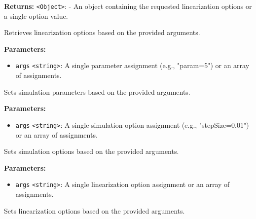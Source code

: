 \documentclass[12pt,a4paper]{article}
\begin{document}
\noindent \textbf{Returns:} \texttt{<Object>}: - An object containing the requested linearization options or a single option value.

\noindent Retrieves linearization options based on the provided arguments.

\vspace{5mm}
\noindent {}


\noindent \textbf{Parameters:}
\begin{itemize}
  \item \texttt{args} \texttt{<string>}: A single parameter assignment (e.g., "param=5") or an array of assignments.
\end{itemize}

\noindent Sets simulation parameters based on the provided arguments.

\vspace{5mm}
\noindent {}


\noindent \textbf{Parameters:}
\begin{itemize}
  \item \texttt{args} \texttt{<string>}: A single simulation option assignment (e.g., "stepSize=0.01") or an array of assignments.
\end{itemize}

\noindent Sets simulation options based on the provided arguments.

\vspace{5mm}
\noindent {}


\noindent \textbf{Parameters:}
\begin{itemize}
  \item \texttt{args} \texttt{<string>}: A single linearization option assignment or an array of assignments.
\end{itemize}

\noindent Sets linearization options based on the provided arguments.

\vspace{5mm}
\noindent {}
\end{document}
